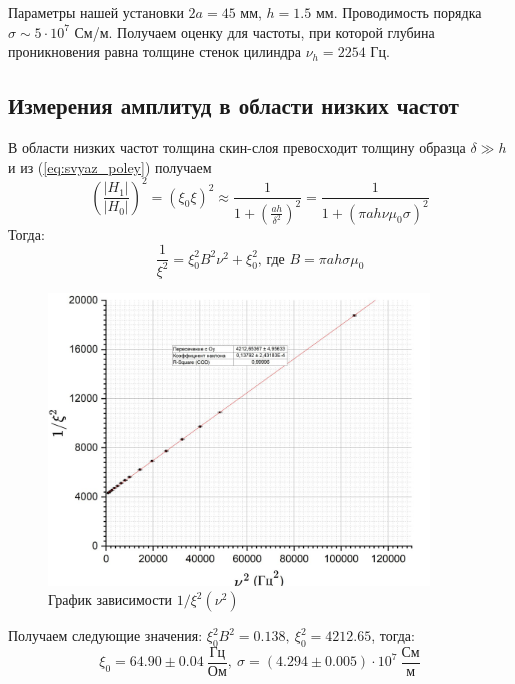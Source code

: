 \documentclass{article}
\begin{document}
	Параметры нашей установки $2a = 45$ мм, $h=1.5$ мм. Проводимость порядка
	$\sigma \sim 5\cdot 10^7$ См/м. Получаем оценку для частоты, при которой
	глубина проникновения равна толщине стенок цилиндра $\nu_h = 2254$ Гц.
	
	\subsection*{Измерения амплитуд в области низких частот}
	В области низких частот толщина скин-слоя превосходит толщину образца $ \delta \gg h$  и из (\ref{eq:svyaz_poley}) получаем
	\begin{equation*}
		\left(\frac{|H_1|}{|H_0|}\right)^2 = (\xi_0\xi)^2 \approx \frac{1}{1+\left(\frac{ah}{\delta^2}\right)^2} = \frac{1}{1 + \left(\pi ah\nu\mu_0\sigma\right)^2}
	\end{equation*}
	Тогда: 
	\begin{equation*}
		\frac{1}{\xi^2}=\xi_0^2B^2\nu^2 + \xi_0^2 \text{, где } B=\pi a h \sigma \mu_0
		\label{eq:liniya_dlya_c}
	\end{equation*}
	\begin{figure}[h!]
		\centering
		\includegraphics[width=0.9\textwidth, height = 0.45\textheight]{15_13_25.png}
		\caption{График зависимости $1/\xi^2(\nu^2)$}\label{fig:xi_nu_low_freq_linearized}
	\end{figure}
	Получаем следующие значения: $\xi_0^2B^2 = 0.138, \ \xi_0^2 = 4212.65$, тогда:
	\[\xi_0 = 64.90 \pm 0.04 \ \frac{\text{Гц}}{\text{Ом}}, \ \sigma = (4.294 \pm 0.005) \cdot 10^7 \ \frac{\text{См}}{\text{м}}  \]
	
\end{document}
